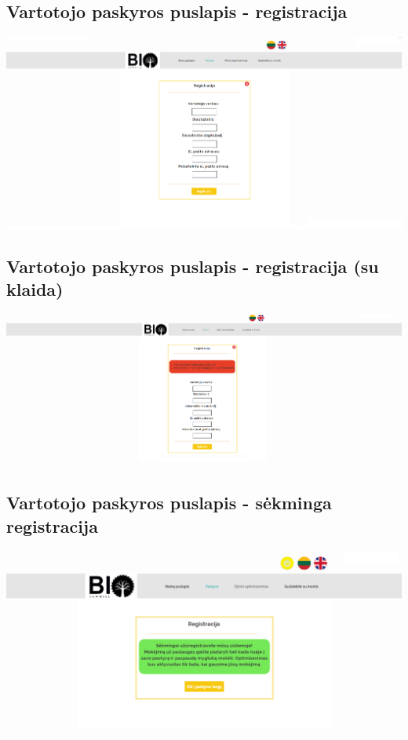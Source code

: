 \documentclass[a4paper,12pt]{article}
\begin{document}
\subsection{Vartotojo paskyros puslapis - registracija}
\hspace{-2cm}
\includegraphics[scale=0.5]{interfeisai/paskyrosPuslapisRegistracija}

\subsection{Vartotojo paskyros puslapis - registracija (su klaida)}
\hspace{-2cm}
\includegraphics[scale=0.5]{interfeisai/paskyrosPuslapisRegistracijaSuKlaida}

\subsection{Vartotojo paskyros puslapis - sėkminga registracija}
\hspace{-2cm}
\includegraphics[scale=0.5]{interfeisai/paskyrosPuslapisRegistracijaSekminga}
\end{document}
